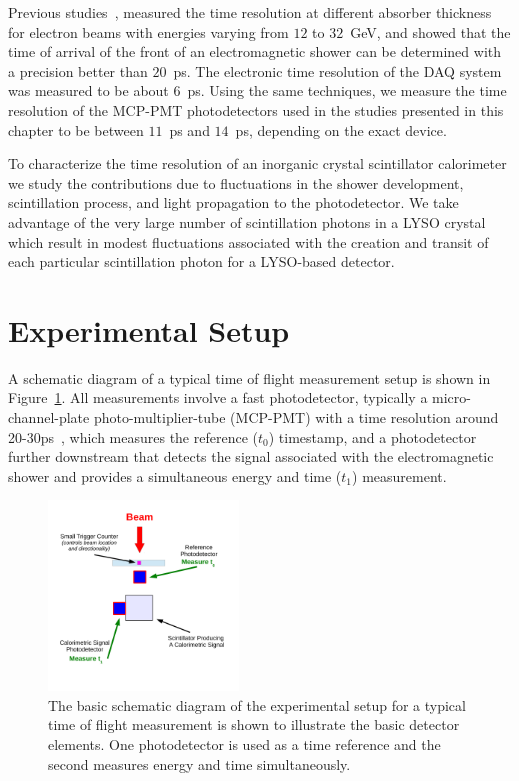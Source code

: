 Previous studies~\cite{MCPFastCaloNIMA}, measured the time resolution at different
absorber thickness for electron beams with energies varying from $12$ to
$32$~GeV, and showed that the time of arrival of the front of an electromagnetic
shower can be determined with a precision better than $20$~ps. The electronic
time resolution of the DAQ system was measured to be about $6$~ps. Using
the same techniques, we measure the time resolution of the MCP-PMT photodetectors 
used in the studies presented in this chapter to be between $11$~ps and $14$~ps, depending 
on the exact device.

To characterize the time resolution of an inorganic crystal scintillator calorimeter we
study the contributions due to fluctuations in the shower development, scintillation process, 
and light propagation to the photodetector.  We take advantage of the very large number of 
scintillation photons in a LYSO crystal which result in modest fluctuations associated with the 
creation and transit of each particular scintillation photon for a LYSO-based detector. 

\section{Experimental Setup}

A schematic diagram of a typical time of flight measurement setup is shown in 
Figure~\ref{fig:TypicalSchematicDiagram}. All measurements involve a fast photodetector,  
typically a micro-channel-plate photo-multiplier-tube 
(MCP-PMT) with a time resolution around 20-30\unit{ps}~\cite{MCPFastCaloNIMA}, which measures the reference ($t_{0}$) timestamp, and a photodetector further 
downstream that detects the signal associated with the electromagnetic shower and provides 
a simultaneous energy and time ($t_{1}$) measurement. 

\begin{figure}[H] \centering
\includegraphics[width=0.45\textwidth]{figs/timing/TypicalSchematicDiagram} 
\caption{ The basic schematic diagram of the experimental setup for
a typical time of flight measurement is shown to illustrate the
basic detector elements. One photodetector is used as a time reference and the second 
measures energy and time simultaneously.} 
\label{fig:TypicalSchematicDiagram}
\end{figure}

